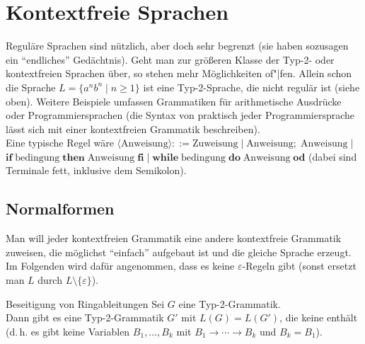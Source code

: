 \section{%
    Kontextfreie Sprachen%
}

\begin{Bem}
    Reguläre Sprachen sind nützlich, aber doch sehr begrenzt
    (sie haben sozusagen ein "`endliches"' Gedächtnis).
    Geht man zur größeren Klasse der Typ-2- oder kontextfreien Sprachen über,
    so stehen mehr Möglichkeiten of"|fen.
    Allein schon die Sprache $L = \{a^n b^n \;|\; n \ge 1\}$ ist eine
    Typ-2-Sprache, die nicht regulär ist (siehe oben).
    Weitere Beispiele umfassen Grammatiken für arithmetische Ausdrücke
    oder Programmiersprachen (die Syntax von praktisch jeder Programmiersprache
    lässt sich mit einer kontextfreien Grammatik beschreiben).\\
    Eine typische Regel wäre $\langle\text{Anweisung}\rangle ::=
    \text{Zuweisung} \;|\;
    \text{Anweisung}\mathbf{;}\; \text{Anweisung} \;|\;$\\
    $\mathbf{if}\; \text{bedingung}\; \mathbf{then}\; \text{Anweisung}\;
    \mathbf{fi} \;|\;
    \mathbf{while}\; \text{bedingung}\; \mathbf{do}\; \text{Anweisung}\;
    \mathbf{od}$
    (dabei sind Terminale fett, inklusive dem Semikolon).
\end{Bem}

\subsection{%
    Normalformen%
}

\begin{Bem}
    Man will jeder kontextfreien Grammatik eine andere
    kontextfreie Grammatik zuweisen, die möglichst
    "`einfach"' aufgebaut ist und die gleiche Sprache erzeugt.\\
    Im Folgenden wird dafür angenommen, dass es keine $\varepsilon$-Regeln
    gibt (sonst ersetzt man $L$ durch $L \setminus \{\varepsilon\}$).
\end{Bem}

\begin{Lemma}{Beseitigung von Ringableitungen}
    Sei $G$ eine Typ-2-Grammatik.\\
    Dann gibt es eine Typ-2-Grammatik $G'$ mit $L(G) = L(G')$, die keine
     enthält
    (d.\,h. es gibt keine Variablen $B_1, \dotsc, B_k$ mit
    $B_1 \rightarrow \dotsb \rightarrow B_k$ und $B_k = B_1$).
\end{Lemma}

